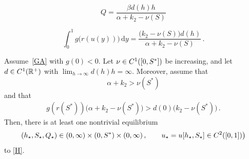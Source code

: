 \documentclass[10pt,a4paper]{amsart}
\newcommand{\R}{\mathbb{R}}
\newcommand{\rd}{\mathrm{d}}
\begin{document}
\begin{equation}\label{Q}
Q=\frac{\beta d(h)h}{\alpha+k_2-\nu(S)}
\end{equation}

\begin{equation}\label{gp}
\int_0^{1} g\big(r(u(y))\big)\,\rd y=\frac{\big(k_2-\nu(S)\big) d(h)}{\alpha+k_2-\nu(S)} \,.
\end{equation}

\begin{thm}\label{P5}
Assume~\eqref{GA} with  $g(0)<0$. Let $\nu\in {\rm C}^1([0,S^*])$ be increasing, and let $d\in {\rm C}^1(\R^+)$ with $\lim_{h\to\infty} d(h)h=\infty$. Moreover, assume that
\begin{equation}\label{n1}
\alpha+k_2> \nu(S^*)
\end{equation}
and that
\begin{align}\label{n2}
g(r(S^*))\big(\alpha+k_2-\nu(S^*)\big)> d(0)\big(k_2 -\nu(S^*)\big)\,.
\end{align}
Then, there is at least one nontrivial equilibrium 
$$
(h_\star,S_\star,Q_\star)\in (0,\infty)\times (0,S^*)\times (0,\infty)\,,\qquad  u_\star=u[h_\star,S_\star]\in {\rm C}^2([0,1])\big)
$$ 
to \eqref{H}. 
\end{thm}
\end{document}
